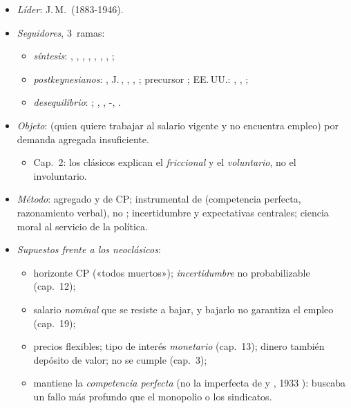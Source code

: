 \documentclass{article}
\begin{document}
\begin{columnas}
\begin{itemize}
\item \emph{Líder}: J.\,M.\, (1883-1946).
\item \emph{Seguidores}, 3~ramas:
  \begin{itemize}
  \item \emph{síntesis}: , , , , , , ,  ;
  \item \emph{postkeynesianos}: , J.\,, , , ; precursor ; EE.\,UU.: , , ;
  \item \emph{desequilibrio}: ; , , -, .
  \end{itemize}
\item \emph{Objeto}:  (quien quiere trabajar al salario vigente y no encuentra empleo) por demanda agregada insuficiente.
  \begin{itemize}
  \item Cap.~2: los clásicos explican el \emph{friccional} y el \emph{voluntario}, no el involuntario.
  \end{itemize}
\item \emph{Método}: agregado y de CP; instrumental de  (competencia perfecta, razonamiento verbal), no ; incertidumbre y expectativas centrales; ciencia moral al servicio de la política.
\item \emph{Supuestos frente a los neoclásicos}:
  \begin{itemize}
  \item horizonte CP («todos muertos»); \emph{incertidumbre} no probabilizable (cap.~12);
  \item salario \emph{nominal} que se resiste a bajar, y bajarlo no garantiza el empleo (cap.~19);
  \item precios flexibles; tipo de interés \emph{monetario} (cap.~13); dinero también depósito de valor; no se cumple  (cap.~3);
  \item mantiene la \emph{competencia perfecta} (no la imperfecta de  y , 1933 ): buscaba un fallo más profundo que el monopolio o los sindicatos.
  \end{itemize}
\end{itemize}


\end{columnas}
\end{document}
